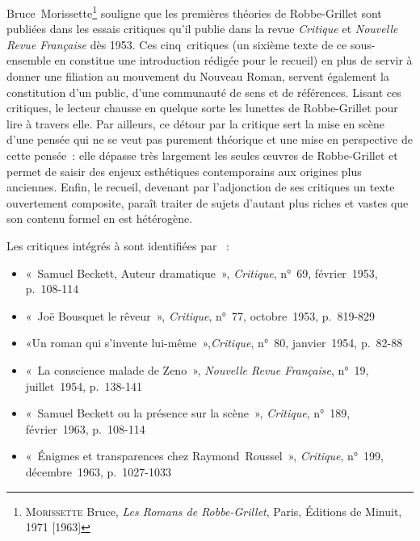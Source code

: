 \documentclass[12pt, a4paper]{article}
\begin{document}
Bruce~Morissette\footnote{\textsc{Morissette} Bruce, \textit{Les Romans de Robbe-Grillet}, Paris, Éditions de Minuit, 1971 [1963]} souligne que les premières théories de Robbe-Grillet sont publiées dans les essais critiques qu'il publie dans la revue \textit{Critique} et \textit{Nouvelle Revue Française} dès 1953. Ces cinq~critiques (un sixième texte de ce sous-ensemble en constitue une introduction rédigée pour le recueil) en plus de servir à donner une filiation au mouvement du Nouveau Roman, servent également la constitution d'un public, d'une communauté de sens et de références. Lisant ces critiques, le lecteur chausse en quelque sorte les lunettes de Robbe-Grillet pour lire à travers elle. Par ailleurs, ce détour par la critique sert la mise en scène d'une pensée qui ne se veut pas purement théorique et une mise en perspective de cette pensée~: elle dépasse très largement les seules œuvres de Robbe-Grillet et permet de saisir des enjeux esthétiques contemporains aux origines plus anciennes. Enfin, le recueil, devenant par l'adjonction de ses critiques un texte ouvertement composite, paraît traiter de sujets d'autant plus riches et vastes que son contenu formel en est hétérogène.

Les critiques intégrés à \punr{} sont identifiées par \galia~:
\begin{itemize}
    \item «~Samuel Beckett, Auteur dramatique~», \textit{Critique}, n°~69, février~1953, p.~108-114
    \item «~Joë Bousquet le rêveur~», \textit{Critique}, n°~77, octobre~1953, p.~819-829
    \item «Un roman qui s'invente lui-même~»,\textit{Critique}, n°~80, janvier~1954, p.~82-88
    \item «~La conscience malade de Zeno~», \textit{Nouvelle Revue Française}, n°~19, juillet~1954, p.~138-141
    \item «~Samuel Beckett ou la présence sur la scène~», \textit{Critique}, n°~189, février~1963, p.~108-114
    \item «~Énigmes et transparences chez Raymond~Roussel~», \textit{Critique}, n°~199, décembre~1963, p.~1027-1033
\end{itemize}
\end{document}
